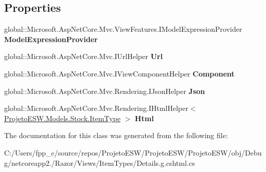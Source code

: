 \subsection*{Properties}
\begin{DoxyCompactItemize}
\item 
\mbox{\label{class_asp_net_core_1_1_views___item_types___details_afb023fbdcd6468b4a23ab3053ef75517}} 
global\+::\+Microsoft.\+Asp\+Net\+Core.\+Mvc.\+View\+Features.\+I\+Model\+Expression\+Provider {\bfseries Model\+Expression\+Provider}
\item 
\mbox{\label{class_asp_net_core_1_1_views___item_types___details_a83afb44a96eedb15c03a5ce6ca3cc429}} 
global\+::\+Microsoft.\+Asp\+Net\+Core.\+Mvc.\+I\+Url\+Helper {\bfseries Url}
\item 
\mbox{\label{class_asp_net_core_1_1_views___item_types___details_a595d483c3305a32b6e646f13ae16b742}} 
global\+::\+Microsoft.\+Asp\+Net\+Core.\+Mvc.\+I\+View\+Component\+Helper {\bfseries Component}
\item 
\mbox{\label{class_asp_net_core_1_1_views___item_types___details_a3c21569417ab62a785843b7517d4e9ea}} 
global\+::\+Microsoft.\+Asp\+Net\+Core.\+Mvc.\+Rendering.\+I\+Json\+Helper {\bfseries Json}
\item 
\mbox{\label{class_asp_net_core_1_1_views___item_types___details_a06d9ae04e855e937866948b5bf8ed00d}} 
global\+::\+Microsoft.\+Asp\+Net\+Core.\+Mvc.\+Rendering.\+I\+Html\+Helper$<$ \mbox{\hyperlink{class_projeto_e_s_w_1_1_models_1_1_stock_1_1_item_type}{Projeto\+E\+S\+W.\+Models.\+Stock.\+Item\+Type}} $>$ {\bfseries Html}
\end{DoxyCompactItemize}


The documentation for this class was generated from the following file\+:\begin{DoxyCompactItemize}
\item 
C\+:/\+Users/fpp\+\_\+c/source/repos/\+Projeto\+E\+S\+W/\+Projeto\+E\+S\+W/\+Projeto\+E\+S\+W/obj/\+Debug/netcoreapp2./\+Razor/\+Views/\+Item\+Types/Details.\+g.\+cshtml.\+cs\end{DoxyCompactItemize}
